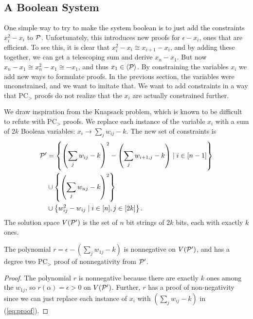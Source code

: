 \subsection{A Boolean System}
One simple way to try to make the system boolean is to just add the constraints $x_i^2 - x_i$ to $\mathcal P$. Unfortunately, this introduces new proofs for $\epsilon - x_i$, ones that are efficient. To see this, it is clear that $x_i^2 - x_i \cong x_{i+1} - x_i$, and by adding these together, we can get a telescoping sum and derive $x_n - x_1$. But now $x_n - x_1 \cong x_n^2 - x_1 \cong -x_1$, and thus $x_1 \in \langle \mathcal P \rangle$. By constraining the variables $x_i$ we add new ways to formulate proofs. In the previous section, the variables were unconstrained, and we want to imitate that. We want to add constraints in a way that PC$_>$ proofs do not realize that the $x_i$ are actually constrained further.

We draw inspiration from the Knapsack problem, which is known to be difficult to refute with PC$_>$ proofs. We replace each instance of the variable $x_i$ with a sum of $2k$ Boolean variables: $x_i \rightarrow \sum_j w_{ij} - k$. The new set of constraints is
\begin{align*}
\mathcal P' &= \left\{\left(\sum_j w_{ij} - k\right)^2 - \left(\sum_j w_{i+1,j} - k\right) \mid i \in [n-1]\right\} \\
&\cup \left\{\left(\sum_j w_{nj} - k\right)^2 \right\} \\
&\cup \left\{w_{ij}^2 - w_{ij} \mid i \in [n], j \in [2k]\right\}.
\end{align*}
The solution space $V(\mathcal P')$ is the set of $n$ bit strings of $2k$ bits, each with exactly $k$ ones.
\begin{lemma}\label{lem:boolean-degtwoproof}
The polynomial $r = \epsilon - \left(\sum_j w_{1j} - k\right)$ is nonnegative on $V(\mathcal P')$, and has a degree two PC$_>$ proof of nonnegativity from $\mathcal P'$.
\end{lemma}
\begin{proof}
The polynomial $r$ is nonnegative because there are exactly $k$ ones among the $w_{1j}$, so $r(\alpha) = \epsilon > 0$ on $V(\mathcal P')$.
Further, $r$ has a proof of non-negativity since we can just replace each instance of $x_i$ with $\left(\sum_j w_{ij} - k\right)$ in (\ref{eq:proof}). 
\end{proof}

